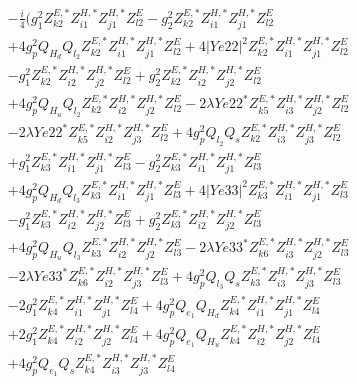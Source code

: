 \begin{align} 
 &-\frac{i}{4} \Big(g_{1}^{2} Z^{E,*}_{k 2} Z^{H,*}_{i 1} Z^{H,*}_{j 1} Z_{{l 2}}^{E} - g_{2}^{2} Z^{E,*}_{k 2} Z^{H,*}_{i 1} Z^{H,*}_{j 1} Z_{{l 2}}^{E} \nonumber \\ 
 &+4 g_{p}^{2} Q_{H_d} Q_{l_2} Z^{E,*}_{k 2} Z^{H,*}_{i 1} Z^{H,*}_{j 1} Z_{{l 2}}^{E} +4 |Ye22|^2 Z^{E,*}_{k 2} Z^{H,*}_{i 1} Z^{H,*}_{j 1} Z_{{l 2}}^{E} \nonumber \\ 
 &- g_{1}^{2} Z^{E,*}_{k 2} Z^{H,*}_{i 2} Z^{H,*}_{j 2} Z_{{l 2}}^{E} +g_{2}^{2} Z^{E,*}_{k 2} Z^{H,*}_{i 2} Z^{H,*}_{j 2} Z_{{l 2}}^{E} \nonumber \\ 
 &+4 g_{p}^{2} Q_{H_u} Q_{l_2} Z^{E,*}_{k 2} Z^{H,*}_{i 2} Z^{H,*}_{j 2} Z_{{l 2}}^{E} -2 \lambda Ye22^* Z^{E,*}_{k 5} Z^{H,*}_{i 3} Z^{H,*}_{j 2} Z_{{l 2}}^{E} \nonumber \\ 
 &-2 \lambda Ye22^* Z^{E,*}_{k 5} Z^{H,*}_{i 2} Z^{H,*}_{j 3} Z_{{l 2}}^{E} +4 g_{p}^{2} Q_{l_2} Q_s Z^{E,*}_{k 2} Z^{H,*}_{i 3} Z^{H,*}_{j 3} Z_{{l 2}}^{E} \nonumber \\ 
 &+g_{1}^{2} Z^{E,*}_{k 3} Z^{H,*}_{i 1} Z^{H,*}_{j 1} Z_{{l 3}}^{E} - g_{2}^{2} Z^{E,*}_{k 3} Z^{H,*}_{i 1} Z^{H,*}_{j 1} Z_{{l 3}}^{E} \nonumber \\ 
 &+4 g_{p}^{2} Q_{H_d} Q_{l_3} Z^{E,*}_{k 3} Z^{H,*}_{i 1} Z^{H,*}_{j 1} Z_{{l 3}}^{E} +4 |Ye33|^2 Z^{E,*}_{k 3} Z^{H,*}_{i 1} Z^{H,*}_{j 1} Z_{{l 3}}^{E} \nonumber \\ 
 &- g_{1}^{2} Z^{E,*}_{k 3} Z^{H,*}_{i 2} Z^{H,*}_{j 2} Z_{{l 3}}^{E} +g_{2}^{2} Z^{E,*}_{k 3} Z^{H,*}_{i 2} Z^{H,*}_{j 2} Z_{{l 3}}^{E} \nonumber \\ 
 &+4 g_{p}^{2} Q_{H_u} Q_{l_3} Z^{E,*}_{k 3} Z^{H,*}_{i 2} Z^{H,*}_{j 2} Z_{{l 3}}^{E} -2 \lambda Ye33^* Z^{E,*}_{k 6} Z^{H,*}_{i 3} Z^{H,*}_{j 2} Z_{{l 3}}^{E} \nonumber \\ 
 &-2 \lambda Ye33^* Z^{E,*}_{k 6} Z^{H,*}_{i 2} Z^{H,*}_{j 3} Z_{{l 3}}^{E} +4 g_{p}^{2} Q_{l_3} Q_s Z^{E,*}_{k 3} Z^{H,*}_{i 3} Z^{H,*}_{j 3} Z_{{l 3}}^{E} \nonumber \\ 
 &-2 g_{1}^{2} Z^{E,*}_{k 4} Z^{H,*}_{i 1} Z^{H,*}_{j 1} Z_{{l 4}}^{E} +4 g_{p}^{2} Q_{e_{1}} Q_{H_d} Z^{E,*}_{k 4} Z^{H,*}_{i 1} Z^{H,*}_{j 1} Z_{{l 4}}^{E} \nonumber \\ 
 &+2 g_{1}^{2} Z^{E,*}_{k 4} Z^{H,*}_{i 2} Z^{H,*}_{j 2} Z_{{l 4}}^{E} +4 g_{p}^{2} Q_{e_{1}} Q_{H_u} Z^{E,*}_{k 4} Z^{H,*}_{i 2} Z^{H,*}_{j 2} Z_{{l 4}}^{E} \nonumber \\ 
 &+4 g_{p}^{2} Q_{e_{1}} Q_s Z^{E,*}_{k 4} Z^{H,*}_{i 3} Z^{H,*}_{j 3} Z_{{l 4}}^{E} \nonumber \\ 

\end{align}
